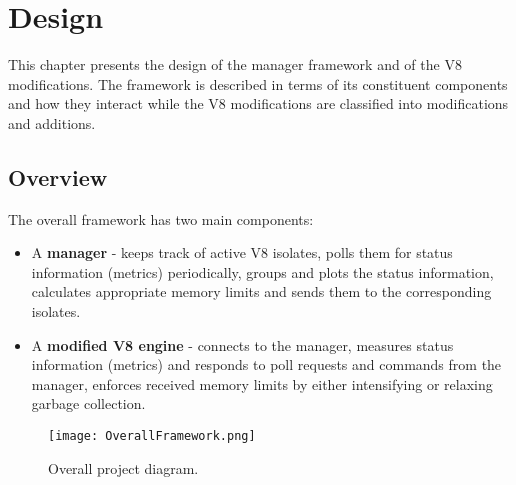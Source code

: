 \documentclass{l4proj}
\begin{document}
\chapter{Design}
\hspace*{1em} This chapter presents the design of the manager framework and of the V8 modifications. The framework is described in terms of its constituent components and how they interact while the V8 modifications are classified into modifications and additions.
\section{Overview}

The overall framework has two main components:
\begin{itemize}
\item A \textbf{manager} - keeps track of active V8 isolates, polls them for status information (metrics) periodically, groups and plots the status information, calculates appropriate memory limits and sends them to the corresponding isolates.
\item A \textbf{modified V8 engine} - connects to the manager, measures status information (metrics) and responds to poll requests and commands from the manager, enforces received memory limits by either intensifying or relaxing garbage collection.
\end{itemize}

\begin{figure}[!ht]
  \centering
    \texttt{[image: OverallFramework.png]}
  \caption{Overall project diagram.}
\end{figure}
\end{document}
